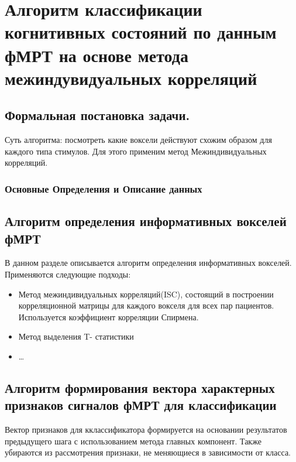 \chapter{Алгоритм классификации когнитивных состояний по данным фМРТ на основе метода межиндувидуальных корреляций}


\section{Формальная постановка задачи.}
\begin{annotation}
	Суть алгоритма: посмотреть какие воксели действуют схожим образом для каждого типа стимулов. Для этого применим метод Межиндивидуальных корреляций.
\end{annotation}

\subsection*{Основные Определения и Описание данных}




\section{Алгоритм определения информативных вокселей фМРТ}
\begin{annotation}
В данном разделе описывается алгоритм определения информативных вокселей. Применяются следующие подходы:
\begin{itemize}
	\item Метод межиндивидуальных корреляций(ISC), состоящий в построении корреляционной матрицы для каждого вокселя для всех пар пациентов. Используется коэффициент корреляции Спирмена.
	\item Метод выделения T- статистики
	\item \ldots
\end{itemize}
\end{annotation}

\section{Алгоритм формирования вектора характерных признаков сигналов фМРТ для классификации}
\begin{annotation}
Вектор признаков для кклассификатора формируется на основании результатов предыдущего шага с использованием метода главных компонент. Также убираются из рассмотрения признаки, не меняющиеся в зависимости от класса.
\end{annotation}

